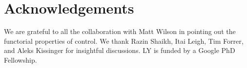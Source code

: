 \section{Acknowledgements}
We are grateful to all the collaboration with Matt Wilson in pointing out the functorial properties of control. We thank Razin Shaikh, Itai Leigh, Tim Forrer, and Aleks Kissinger for insightful discussions.
LY is funded by a Google PhD Fellowship.